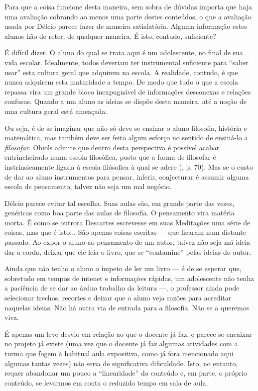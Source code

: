 \documentclass[12pt,a4paper]{article}
\begin{document}
	Para que a coisa funcione desta maneira, sem sobra de dúvidas importa que 
	haja uma avaliação cobrando ao menos uma parte destes conteúdos, o que a 
	avaliação usada por Délcio parece fazer de maneira satisfatória. Alguma 
	informação estes alunos hão de reter, de qualquer maneira. É isto, contudo, 
	suficiente? 
	
	É difícil dizer. O aluno do qual se trata aqui é um adolescente, no final 
	de sua vida escolar. Idealmente, todos deveriam ter instrumental 
	suficiente para ``saber usar'' esta cultura geral que adquirem na escola. 
	A realidade, contudo, é que nunca adquirem esta maturidade a tempo. De 
	modo que tudo o que a escola repassa vira um grande bloco inexpugnável de 
	informações desconexas e relações confusas. Quando a um aluno as ideias 
	se dispõe desta maneira, até a noção de uma cultura geral está ameaçada. 
	
	Ou seja, é de se imaginar que não só deve se ensinar o aluno filosofia, 
	história e matemática, mas também deve ser feito algum esforço no sentido 
	de ensiná-lo a \textit{filosofar}. Obiols admite que dentro desta 
	perspectiva é possível acabar entrincheirado numa escola filosófica, posto 
	que a forma de filosofar é instrinsicamente ligada à escola filósofica à 
	qual se adere (\cite{obiols}, p. 70). Mas se o custo de dar ao aluno 
	instrumentos para pensar, inferir, conjecturar é assumir alguma escola 
	de pensamento, talvez não seja um mal negócio. 
	
	Délcio parece evitar tal escolha. Suas aulas são, em grande parte das 
	vezes, genéricas como boa parte das aulas de filosofia. O pensamento 
	vira matéria morta. É como se outrora Descartes escrevesse em suas 
	Meditações uma série de coisas, mas que é isto... São apenas coisas 
	escritas --- que ficaram num distante passado. Ao expor o aluno ao 
	pensamento de um autor, talvez não seja má ideia dar a corda, deixar 
	que ele leia o livro, que se ``contamine'' pelas ideias do autor. 
	
	Ainda que não tenho o aluno o ímpeto de ler um livro --- é de se 
	esperar que, sobretudo em tempos de intenet e informações rápidas, 
	um adolescente não tenha a paciência de se dar ao árduo trabalho da 
	leitura ---, o professor ainda pode selecionar trechos, recortes 
	e deixar que o aluno veja razões para acreditar naquelas ideias. 
	Não há outra via de entrada para a filosofia. Não se a queremos viva. 
	
	É apenas um leve desvio em relação ao que o docente já faz, e parece 
	se encaixar no projeto já existe (uma vez que o docente já faz algumas 
	atividades com a turma que fogem à habitual aula expositiva, como já 
	fora mencionado aqui algumas tantas vezes) não seria de significativa 
	dificuldade. Isto, no entanto, requer abandonar um pouco a ``linearidade'' 
	do conteúdo e, em parte, o próprio conteúdo, se levarmos em conta o 
	reduzido tempo em sala de aula. 
	
\end{document}
